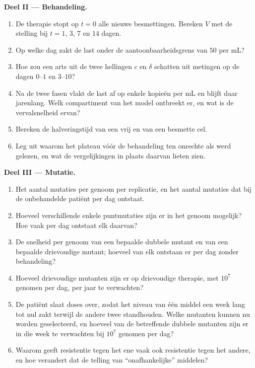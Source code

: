 \begin{problem}
\medskip
\noindent\textbf{Deel II --- Behandeling.}
\begin{enumerate}[resume]
  \item De therapie stopt op $t = 0$ alle nieuwe besmettingen. Bereken
        $V$ met de stelling bij $t =
        1$, $3$, $7$ en $14$ dagen.
  \item Op welke dag zakt de last onder de aantoonbaarheidsgrens van
        $50$ per mL?
  \item Hoe zou een arts uit de twee hellingen $c$ en $\delta$ schatten
        uit metingen op de dagen $0$--$1$ en $3$--$10$?
  \item Na de twee fasen vlakt de last af op enkele kopieën per mL en
        blijft daar jarenlang. Welk compartiment van het model ontbreekt
        er, en wat is de vervalsnelheid ervan?
  \item Bereken de halveringstijd van een vrij  en van een besmette
        cel.
  \item Leg uit waarom het plateau vóór de behandeling ten onrechte als
         werd gelezen, en wat de vergelijkingen in plaats
        daarvan lieten zien.
\end{enumerate}

\medskip
\noindent\textbf{Deel III --- Mutatie.}
\begin{enumerate}[resume]
  \item Het aantal mutaties per genoom per replicatie, en het aantal
        mutaties dat bij de onbehandelde patiënt per dag ontstaat.
  \item Hoeveel verschillende enkele puntmutaties zijn er in het genoom
        mogelijk? Hoe vaak per dag ontstaat elk daarvan?
  \item De snelheid per genoom van een bepaalde dubbele mutant en van
        een bepaalde drievoudige mutant; hoeveel van elk ontstaan er per
        dag zonder behandeling?
  \item Hoeveel drievoudige mutanten zijn er op drievoudige therapie, met
        $10^{7}$ genomen per dag, per jaar te verwachten?
  \item De patiënt slaat doses over, zodat het niveau van één middel een
        week lang tot nul zakt terwijl de andere twee standhouden.
        Welke mutanten kunnen nu worden geselecteerd, en hoeveel van de
        betreffende dubbele mutanten zijn er in die week te verwachten
        bij $10^{7}$ genomen per dag?
  \item Waarom geeft resistentie tegen het ene  vaak
        ook resistentie tegen het andere, en hoe verandert dat de
        telling van ``onafhankelijke'' middelen?
\end{enumerate}


\end{problem}
